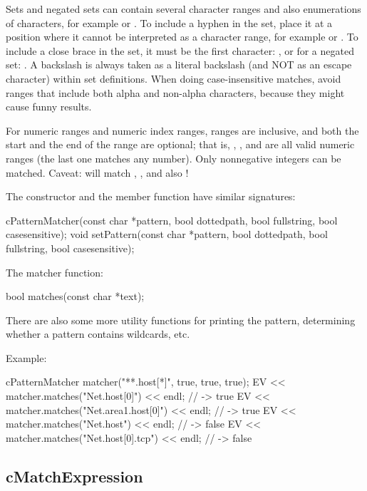 Sets and negated sets can contain several character ranges and also
enumerations of characters, for example  or
. To include a hyphen in the set, place it at a position
where it cannot be interpreted as a character range, for example
 or . To include a close brace in
the set, it must be the first character: , or for a negated
set: . A backslash is always taken as a
literal backslash (and NOT as an escape character) within set definitions.
When doing case-insensitive matches, avoid ranges that include both alpha and
non-alpha characters, because they might cause funny results.

For numeric ranges and numeric index ranges, ranges are inclusive, and both
the start and the end of the range are optional; that is, ,
, and  are all valid numeric ranges (the last one
matches any number). Only nonnegative integers can be matched. Caveat:
 will match , , and also !

The  constructor and the  member
function have similar signatures:

\begin{cpp}
cPatternMatcher(const char *pattern, bool dottedpath, bool fullstring,
                bool casesensitive);
void setPattern(const char *pattern, bool dottedpath, bool fullstring,
                bool casesensitive);
\end{cpp}

The matcher function:

\begin{cpp}
bool matches(const char *text);
\end{cpp}

There are also some more utility functions for printing the pattern,
determining whether a pattern contains wildcards, etc.

Example:

\begin{cpp}
cPatternMatcher matcher("**.host[*]", true, true, true);
EV << matcher.matches("Net.host[0]") << endl;  // -> true
EV << matcher.matches("Net.area1.host[0]") << endl;  // -> true
EV << matcher.matches("Net.host") << endl;  // -> false
EV << matcher.matches("Net.host[0].tcp") << endl;  // -> false
\end{cpp}


\subsection{cMatchExpression}
\label{sec:sim-lib:cmatchexpression}

